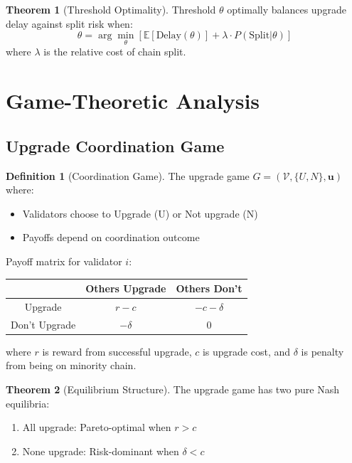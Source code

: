 \documentclass[11pt,a4paper]{article}
\theoremstyle{definition}
\newtheorem{definition}{Definition}[section]
\newtheorem{theorem}{Theorem}[section]
\theoremstyle{remark}
\begin{document}
\begin{theorem}[Threshold Optimality]
Threshold $\theta$ optimally balances upgrade delay against split risk when:
\begin{equation}
    \theta = \arg\min_\theta \left[ \mathbb{E}[\text{Delay}(\theta)] + \lambda \cdot P(\text{Split}|\theta) \right]
\end{equation}
where $\lambda$ is the relative cost of chain split.
\end{theorem}

\section{Game-Theoretic Analysis}

\subsection{Upgrade Coordination Game}

\begin{definition}[Coordination Game]
The upgrade game $G = (\mathcal{V}, \{U, N\}, \mathbf{u})$ where:
\begin{itemize}
    \item Validators choose to Upgrade (U) or Not upgrade (N)
    \item Payoffs depend on coordination outcome
\end{itemize}
\end{definition}

Payoff matrix for validator $i$:

\begin{table}[h]
\centering
\begin{tabular}{c|cc}
 & Others Upgrade & Others Don't \\
\hline
Upgrade & $r - c$ & $-c - \delta$ \\
Don't Upgrade & $-\delta$ & $0$ \\
\end{tabular}
\end{table}

where $r$ is reward from successful upgrade, $c$ is upgrade cost, and $\delta$ is penalty from being on minority chain.

\begin{theorem}[Equilibrium Structure]
The upgrade game has two pure Nash equilibria:
\begin{enumerate}
    \item All upgrade: Pareto-optimal when $r > c$
    \item None upgrade: Risk-dominant when $\delta < c$
\end{enumerate}
\end{theorem}
\end{document}
